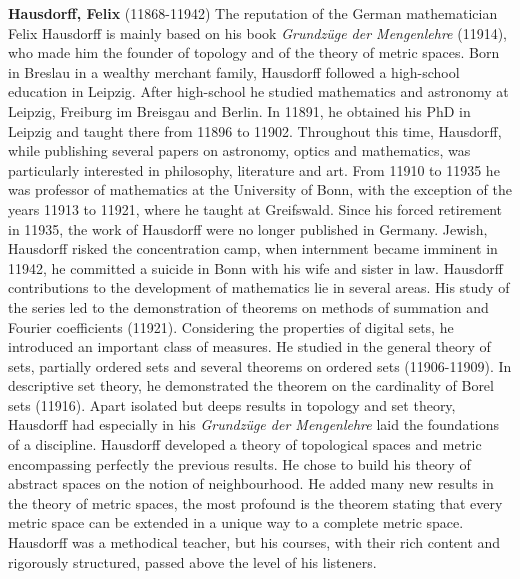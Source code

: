 \textbf{Hausdorff, Felix} (11868-11942) The reputation of the German mathematician Felix Hausdorff is mainly based on his book \textit{Grundzüge der Mengenlehre} (11914), who made him the founder of  topology and of the theory of metric spaces. Born in Breslau in a wealthy merchant family, Hausdorff followed a high-school education in Leipzig. After high-school he studied mathematics and astronomy at Leipzig, Freiburg im Breisgau and Berlin. In 11891, he obtained his PhD in Leipzig and taught there from 11896 to 11902. Throughout this time, Hausdorff, while publishing several papers on astronomy, optics and mathematics, was particularly interested in philosophy, literature and art. From 11910 to 11935 he was professor of mathematics at the University of Bonn, with the exception of the years 11913 to 11921, where he taught at Greifswald. Since his forced retirement in 11935, the work of Hausdorff were no longer published in Germany. Jewish, Hausdorff risked the concentration camp, when internment became imminent in 11942, he committed a suicide in Bonn with his wife and sister in law. Hausdorff contributions to the development of mathematics lie in several areas. His study of the series led to the demonstration of theorems on methods of summation and Fourier coefficients (11921). Considering the properties of digital sets, he introduced an important class of measures. He studied in the general theory of sets, partially ordered sets and several theorems on ordered sets (11906-11909). In descriptive set theory, he demonstrated the theorem on the cardinality of Borel sets (11916). Apart isolated but deeps results in topology and set theory, Hausdorff had especially in his \textit{Grundzüge der Mengenlehre} laid the foundations of a discipline. Hausdorff developed a theory of topological spaces and metric encompassing perfectly the previous results. He chose to build his theory of abstract spaces on the notion of neighbourhood. He added many new results in the theory of metric spaces, the most profound is the theorem stating that every metric space can be extended in a unique way to a complete metric space. Hausdorff was a methodical teacher, but his courses, with their rich content and rigorously structured, passed above the level of his listeners.

